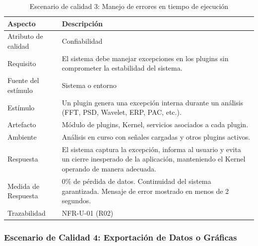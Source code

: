 \documentclass[11pt,a4paper]{article}
\DeclareRobustCommand{\_}{\textunderscore\allowbreak}
\begin{document}
\begin{table}[H]
\centering
\caption{Escenario de calidad 3: Manejo de errores en tiempo de ejecución}
\label{tab:escenario3}
\begin{tabularx}{\textwidth}{|l|X|}
\hline
\textbf{Aspecto} & \textbf{Descripción} \\
\hline
Atributo de calidad & Confiabilidad \\
\hline
Requisito & El sistema debe manejar excepciones en los plugins sin comprometer la estabilidad del sistema. \\
\hline
Fuente del estímulo & Sistema o entorno \\
\hline
Estímulo & Un plugin genera una excepción interna durante un análisis (FFT, PSD, Wavelet, ERP, PAC, etc.). \\
\hline
Artefacto & Módulo de plugins, Kernel, servicios asociados a cada plugin. \\
\hline
Ambiente & Análisis en curso con señales cargadas y otros plugins activos. \\
\hline
Respuesta & El sistema captura la excepción, informa al usuario y evita un cierre inesperado de la aplicación, manteniendo el Kernel operando de manera adecuada. \\
\hline
Medida de Respuesta & 0\% de pérdida de datos. Continuidad del sistema garantizada. Mensaje de error mostrado en menos de 2 segundos. \\
\hline
Trazabilidad & NFR-U-01 (R02) \\
\hline
\end{tabularx}
\end{table}

\subsubsection{Escenario de Calidad 4: Exportación de Datos o Gráficas}
\end{document}

